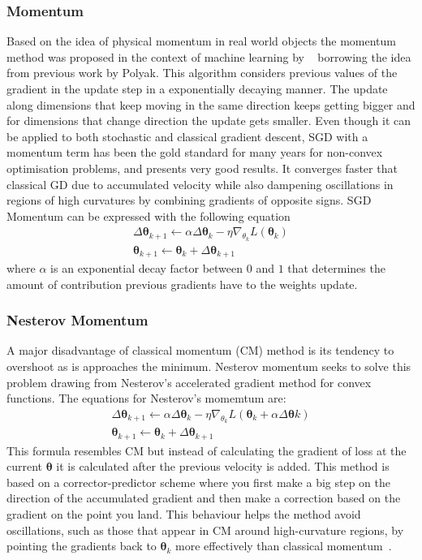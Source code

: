\documentclass[11pt]{article}
\begin{document}
    \subsubsection{ Momentum }
    Based on the idea of physical momentum in real world objects the momentum method was proposed in the context of machine
    learning by ~\cite{rumelhart1986learning} borrowing the idea from previous work by Polyak.
    This algorithm considers previous values of the gradient in the update step in a exponentially decaying manner.
    The update along dimensions that keep moving in the same direction keeps getting bigger and for dimensions that
    change direction the update gets smaller.
    Even though it can be applied to both stochastic and classical gradient descent, SGD with a momentum term has been
    the gold standard for many years for non-convex optimisation problems, and presents very good results.
    It converges faster that classical GD due to accumulated velocity while also dampening oscillations in regions of high
    curvatures by combining gradients of opposite signs.
    SGD Momentum can be expressed with the following equation
    \begin{align*}
        \Delta \pmb\theta_{k+1} \gets \alpha \Delta \pmb\theta_k - \eta \nabla_{\theta_k} L (\pmb\theta_k) \\
        \pmb\theta_{k+1} \gets \pmb\theta_{k} + \Delta \pmb\theta_{k+1}
    \end{align*}
    where $\alpha$ is an exponential decay factor between $0$ and $1$ that determines the amount of contribution
    previous gradients have to the weights update.

    \subsubsection{Nesterov Momentum}
    A major disadvantage of classical momentum (CM) method is its tendency to overshoot as is approaches the minimum.
    Nesterov momentum seeks to solve this problem drawing from Nesterov's accelerated gradient method for convex functions.
    The equations for Nesterov's momemtum are:
    \begin{align*}
        \Delta \pmb\theta_{k+1} \gets \alpha \Delta \pmb\theta_k - \eta \nabla_{\theta_k} L(\pmb\theta_{k} + \alpha \Delta \pmb\theta{k}) \\
        \pmb\theta_{k+1} \gets \pmb\theta_{k} + \Delta \pmb\theta_{k+1}
    \end{align*}
    This formula resembles CM but instead of calculating the gradient of loss at the current $\pmb\theta$ it is
    calculated after the previous velocity is added.
    This method is based on a corrector-predictor scheme where you first make a big step on the direction of the
    accumulated gradient and then make a correction based on the gradient on the point you land.
    This behaviour helps the method avoid oscillations, such as those that appear in CM around high-curvature regions,
    by pointing the gradients back to $\pmb\theta_k$ more effectively than classical momentum~\cite{kashyap2022survey}.
\end{document}

